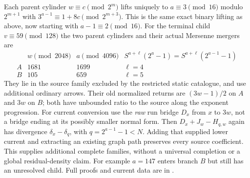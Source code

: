 \documentclass[11pt]{article}
\begin{document}
Each parent cylinder $w\equiv c\pmod{2^m}$ lifts uniquely to
$a\equiv3\pmod{16}$ modulo $2^{m+1}$ with
$3^{a-1}\equiv1+8c\pmod{2^{m+3}}$. This is the same exact binary
lifting as above, now starting with $a-1\equiv2\pmod{16}$.
For the terminal child $v\equiv59\pmod{128}$ the two parent
cylinders and their actual Mersenne mergers are
\[
\begin{array}{c|c|c|c}
&w\pmod{2048}&a\pmod{4096}&S^{a+\ell}(2^a-1)=S^{a+\ell}(2^{a-1}-1)\\\hline
A&1681&1699&\ell=4\\
B&105&659&\ell=5
\end{array}
\]
They lie in the source family excluded by the restricted static
catalogue, and use additional ordinary arrows. Their old normalized
returns are $(3w-1)/2$ on $A$ and $3w$ on $B$; both have unbounded
ratio to the source along the exponent progression.
For current conversion use the \emph{raw} run bridge $D_x$ from
$x$ to $3w$, not a bridge ending at its possibly smaller normal form.
Then $D_x+J_w-H_{q,w}$ again has divergence $\delta_x-\delta_q$,
with $q=2^{a-1}-1<N$. Adding that supplied lower current and extracting
an existing graph path preserves every source coefficient.
This supplies additional complete families, without a universal
completion or a global residual-density claim. For example $a=147$
enters branch $B$ but still has an unresolved child. Full proofs and
current data are in
.
\end{document}

